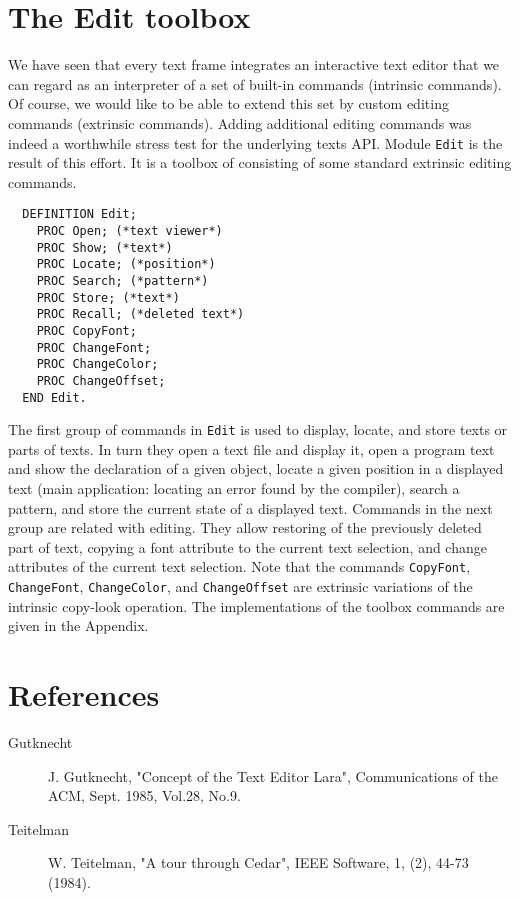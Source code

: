 \section{The Edit toolbox}
We have seen that every text frame integrates an interactive text editor that we can regard as an
interpreter of a set of built-in commands (intrinsic commands). Of course, we would like to be able
to extend this set by custom editing commands (extrinsic commands). Adding additional editing
commands was indeed a worthwhile stress test for the underlying texts API. Module \verb|Edit| is the
result of this effort. It is a toolbox of consisting of some standard extrinsic editing commands.
\begin{verbatim}
  DEFINITION Edit;
    PROC Open; (*text viewer*)
    PROC Show; (*text*)
    PROC Locate; (*position*)
    PROC Search; (*pattern*)
    PROC Store; (*text*)
    PROC Recall; (*deleted text*)
    PROC CopyFont;
    PROC ChangeFont;
    PROC ChangeColor;
    PROC ChangeOffset;
  END Edit.
\end{verbatim}

The first group of commands in \verb|Edit| is used to display, locate, and store texts or parts
of texts. In turn they open a text file and display it, open a program text and show the declaration
of a given object, locate a given position in a displayed text (main application: locating an error
found by the compiler), search a pattern, and store the current state of a displayed text. Commands
in the next group are related with editing. They allow restoring of the previously deleted part of text,
copying a font attribute to the current text selection, and change attributes of the current text
selection. Note that the commands \verb|CopyFont|, \verb|ChangeFont|, \verb|ChangeColor|, and
\verb|ChangeOffset| are extrinsic variations of the intrinsic copy-look operation. The implementations
of the toolbox commands are given in the Appendix.

\section*{References}
\begin{description}
  \item[Gutknecht] J. Gutknecht, "Concept of the Text Editor Lara", Communications of the ACM,
                   Sept. 1985, Vol.28, No.9.
  \item[Teitelman] W. Teitelman, "A tour through Cedar", IEEE Software, 1, (2), 44-73 (1984).
\end{description}
